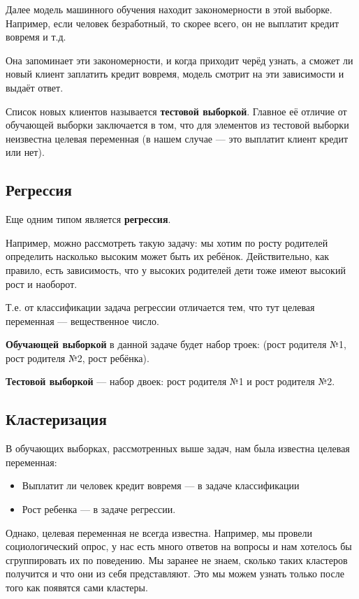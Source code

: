 Далее модель машинного обучения находит закономерности в этой выборке. Например, если человек безработный, то скорее всего, он не выплатит кредит вовремя и т.д. 

Она запоминает эти закономерности, и когда приходит черёд узнать, а сможет ли новый клиент заплатить кредит вовремя, модель смотрит на эти зависимости и выдаёт ответ. 

Список новых клиентов называется \textbf{тестовой выборкой}. Главное её отличие от обучающей выборки заключается в том, что для элементов из тестовой выборки неизвестна целевая переменная (в нашем случае — это выплатит клиент кредит или нет).

\subsection{Регрессия}
Еще одним типом является \textbf{регрессия}. 

Например, можно рассмотреть такую задачу: мы хотим по росту родителей определить насколько высоким может быть их ребёнок. Действительно, как правило, есть зависимость, что у высоких родителей дети тоже имеют высокий рост и наоборот. 

Т.е. от классификации задача регрессии отличается тем, что тут целевая переменная — вещественное число.

\textbf{Обучающей выборкой} в данной задаче будет набор троек: (рост родителя №1, рост родителя №2, рост ребёнка). 

\textbf{Тестовой выборкой} — набор двоек: рост родителя №1 и рост родителя №2.

\subsection{Кластеризация}
В обучающих выборках, рассмотренных выше задач, нам была известна целевая переменная:
\begin{itemize}
    \item Выплатит ли человек кредит вовремя — в задаче классификации
    \item Рост ребенка — в задаче регрессии.
\end{itemize}

\newpage{}

Однако, целевая переменная не всегда известна. Например, мы провели социологический опрос, у нас есть много ответов на вопросы и нам хотелось бы сгруппировать их по поведению. Мы заранее не знаем, сколько таких кластеров получится и что они из себя представляют. Это мы можем узнать только после того как появятся сами кластеры.


